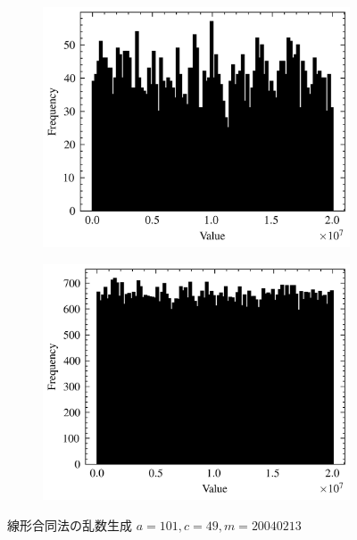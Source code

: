 \begin{figure}
\begin{subfigure}{0.48\linewidth}
		\includegraphics[width=\linewidth]{src/figures/lcg-plot/rand/lcg-2-12.png}
	\end{subfigure}
	\begin{subfigure}{0.48\linewidth}
		\centering
		\includegraphics[width=\linewidth]{src/figures/lcg-plot/rand/lcg-2-16.png}
	\end{subfigure}
	\caption{線形合同法の乱数生成 $a=101, c=49, m=20040213$}\label{fig:lcg-rand}
\end{figure}
